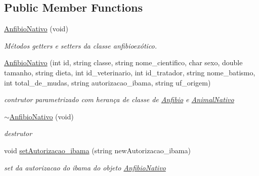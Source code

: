 \subsection*{Public Member Functions}
\begin{DoxyCompactItemize}
\item 
\mbox{\label{class_anfibio_nativo_a9a32a13bd63d6fdd1b8c4876179f7f18}} 
\mbox{\hyperlink{class_anfibio_nativo_a9a32a13bd63d6fdd1b8c4876179f7f18}{Anfibio\+Nativo}} (void)
\begin{DoxyCompactList}\small\item\em Métodos getters e setters da classe anfibioexótico. \end{DoxyCompactList}\item 
\mbox{\label{class_anfibio_nativo_a21ab52bcfac65795977c54818795116b}} 
\mbox{\hyperlink{class_anfibio_nativo_a21ab52bcfac65795977c54818795116b}{Anfibio\+Nativo}} (int id, string classe, string nome\+\_\+cientifico, char sexo, double tamanho, string dieta, int id\+\_\+veterinario, int id\+\_\+tratador, string nome\+\_\+batismo, int total\+\_\+de\+\_\+mudas, string autorizacao\+\_\+ibama, string uf\+\_\+origem)
\begin{DoxyCompactList}\small\item\em contrutor parametrizado com herança de classe de \mbox{\hyperlink{class_anfibio}{Anfibio}} e \mbox{\hyperlink{class_animal_nativo}{Animal\+Nativo}} \end{DoxyCompactList}\item 
\mbox{\label{class_anfibio_nativo_a661695278061e201c479a53d86ec4eb2}} 
\mbox{\hyperlink{class_anfibio_nativo_a661695278061e201c479a53d86ec4eb2}{$\sim$\+Anfibio\+Nativo}} (void)
\begin{DoxyCompactList}\small\item\em destrutor \end{DoxyCompactList}\item 
void \mbox{\hyperlink{class_anfibio_nativo_a815f2903d6831bf07b5571724322b3b2}{set\+Autorizacao\+\_\+ibama}} (string new\+Autorizacao\+\_\+ibama)
\begin{DoxyCompactList}\small\item\em set da autorizacao do ibama do objeto \mbox{\hyperlink{class_anfibio_nativo}{Anfibio\+Nativo}} \end{DoxyCompactList}\item 

\end{DoxyCompactItemize}
